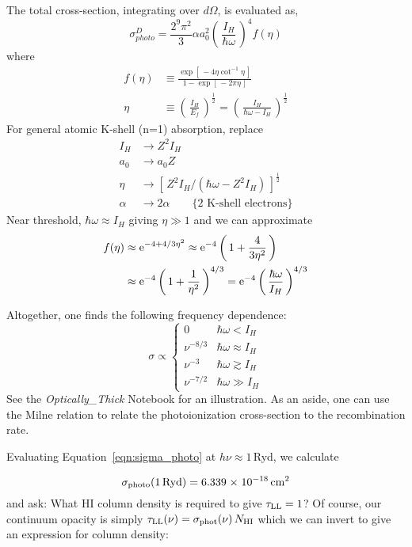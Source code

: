 \documentclass[graybox]{svmult}
\def\ohf{\frac{1}{2}}
\def\ltk{\left [ \,}
\def\ltp{\left ( \,}
\def\rtk{\, \right  ] }
\def\rtp{\, \right  ) }
\def\sci#1{{\; \times \; 10^{#1}}}
\def\rme{{\rm e}}
\newcommand{\mnhi}{N_{\rm HI}}
\def\cm#1{\, {\rm cm^{#1}}}
\begin{document}
The total cross-section, integrating over $d\Omega$, is 
evaluated as,
\begin{equation}
 \sigma^D_{photo} = \frac{2^9 \pi^2}{3} \alpha a_0^2 
    \ltp \frac{I_H}{\hbar\omega} \rtp^4 f(\eta)
\label{eqn:sigma_photo}
\end{equation}
where
	\begin{align}
	f(\eta) &\equiv \frac{\exp \ltk-4\eta \cot^{-1}\eta \rtk}
             {1 - \exp \ltk -2\pi\eta \rtk} \\
	\eta &\equiv \ltp \frac{I_H}{E_f} \rtp^\ohf = 
	   \ltp \frac{I_H}{\hbar\omega-I_H} \rtp^\ohf
	\end{align}
For general atomic K-shell (n=1) absorption, replace
\begin{align*}
	I_H &\to Z^2 I_H \\
	a_0 &\to a_0 Z \\
	\eta &\to \ltk Z^2 I_H / (\hbar\omega - Z^2 I_H) \rtk^\ohf \\
	\alpha &\to 2 \alpha  \quad\quad \{ \text{2 K-shell electrons} \}
\end{align*}
Near threshold, $\hbar\omega \approx I_H$ giving $\eta \gg 1$
and we can approximate
\begin{align}
	f(\eta) &\approx \rme^{-4 + 4/3\eta^2} \approx \rme^{-4} 
	   \ltp 1 + \frac{4}{3\eta^2} \rtp \\
	   &\approx \rme^{-4} \ltp 1 + \frac{1}{\eta^2} \rtp^{4/3} =
	   \rme^{-4} \ltp \frac{\hbar\omega}{I_H} \rtp^{4/3}
\end{align}

Altogether, one finds the following frequency dependence:
 \begin{equation}
 \sigma \propto \begin{cases} 0 & \hbar\omega < I_H \\
                             \nu^{-8/3} & \hbar\omega \approx I_H \\
			     \nu^{-3}   & \hbar\omega \gtrsim I_H \\
			     \nu^{-7/2} & \hbar\omega \gg I_H
		\end{cases}
 \end{equation}
See the {\it Optically\_Thick} Notebook for an illustration.
As an aside, one can use the Milne relation to relate the photoionization
cross-section to the recombination rate.

Evaluating Equation~\ref{eqn:sigma_photo} at $h\nu \approx 1$\,Ryd,
we calculate

\begin{equation}
\sigma_{\rm photo}(1\,{\rm Ryd}) = 6.339 \sci{-18} \cm{2}
\end{equation} 
and
ask: What HI column density is required to give $\tau_{\rm LL} = 1$?
Of course, our continuum opacity is simply
$\tau_{\rm LL}(\nu) = \sigma_{\rm phot}(\nu) \, \mnhi$ which
we can invert to give an expression for column density:
\end{document}
